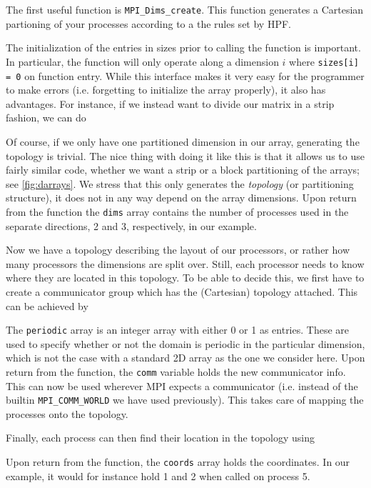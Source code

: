 The first useful function is \texttt{MPI\_Dims\_create}. This function generates
a Cartesian partioning of your processes according to a the rules set by
HPF.

The initialization of the entries in sizes prior to calling the function is
important. In particular, the function will only operate along a dimension $i$
where \texttt{sizes[i] = 0} on function entry. While this interface makes it
very easy for the programmer to make errors (i.e. forgetting to initialize the
array properly), it also has advantages. For instance, if we instead want to
divide our matrix in a strip fashion, we can do

Of course, if we only have one partitioned dimension in our array, generating
the topology is trivial. The nice thing with doing it like this is that it
allows us to use fairly similar code, whether we want a strip or a block
partitioning of the arrays; see \autoref{fig:darrays}. We stress that this only
generates the \emph{topology} (or partitioning structure), it does not in any
way depend on the array dimensions. Upon return from the function the
\texttt{dims} array contains the number of processes used in the separate
directions, 2 and 3, respectively, in our example.

Now we have a topology describing the layout of our processors, or rather how
many processors the dimensions are split over. Still, each processor needs to
know where they are located in this topology. To be able to decide this, we
first have to create a communicator group which has the (Cartesian) topology
attached. This can be achieved by

The \texttt{periodic} array is an integer array with either 0 or 1 as entries.
These are used to specify whether or not the domain is periodic in the
particular dimension, which is not the case with a standard 2D array as the one
we consider here. Upon return from the function, the \texttt{comm} variable
holds the new communicator info. This can now be used wherever MPI expects a
communicator (i.e. instead of the builtin \texttt{MPI\_COMM\_WORLD} we have used
previously). This takes care of mapping the processes onto the topology.

Finally, each process can then find their location in the topology using

Upon return from the function, the \texttt{coords} array holds the coordinates.
In our example, it would for instance hold 1 and 2 when called on process 5.

